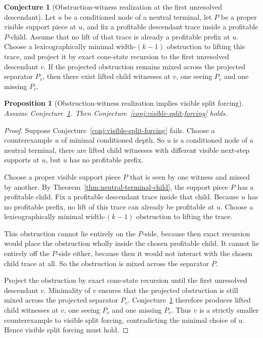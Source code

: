 \documentclass[11pt]{article}
\newtheorem{proposition}[theorem]{Proposition}
\theoremstyle{definition}
\newtheorem{conjecture}[theorem]{Conjecture}
\newcommand{\1}{\mathbf{1}}
\begin{document}
\begin{conjecture}[Obstruction-witness realization at the first unresolved descendant]\label{conj:owr}
Let $u$ be a conditioned node of a neutral terminal, let $P$ be a proper visible support piece at $u$, and fix a profitable descendant trace inside a profitable $P$-child.
Assume that no lift of that trace is already a profitable prefix at $u$.
Choose a lexicographically minimal width-$(k-1)$ obstruction to lifting this trace, and project it by exact cone-state recursion to the first unresolved descendant $v$.
If the projected obstruction remains mixed across the projected separator $P_v$, then there exist lifted child witnesses at $v$, one seeing $P_v$ and one missing $P_v$.
\end{conjecture}

\begin{proposition}[Obstruction-witness realization implies visible split forcing]\label{prop:owr-implies-vsf}
Assume Conjecture~\ref{conj:owr}.
Then Conjecture~\ref{conj:visible-split-forcing} holds.
\end{proposition}

\begin{proof}
Suppose Conjecture~\ref{conj:visible-split-forcing} fails.
Choose a counterexample $u$ of minimal conditioned depth.
So $u$ is a conditioned node of a neutral terminal, there are lifted child witnesses with different visible next-step supports at $u$, but $u$ has no profitable prefix.

Choose a proper visible support piece $P$ that is seen by one witness and missed by another.
By Theorem~\ref{thm:neutral-terminal-child}, the support piece $P$ has a profitable child.
Fix a profitable descendant trace inside that child.
Because $u$ has no profitable prefix, no lift of this trace can already be profitable at $u$.
Choose a lexicographically minimal width-$(k-1)$ obstruction to lifting the trace.

This obstruction cannot lie entirely on the $P$-side, because then exact recursion would place the obstruction wholly inside the chosen profitable child.
It cannot lie entirely off the $P$-side either, because then it would not interact with the chosen child trace at all.
So the obstruction is mixed across the separator $P$.

Project the obstruction by exact cone-state recursion until the first unresolved descendant $v$.
Minimality of $v$ ensures that the projected obstruction is still mixed across the projected separator $P_v$.
Conjecture~\ref{conj:owr} therefore produces lifted child witnesses at $v$, one seeing $P_v$ and one missing $P_v$.
Thus $v$ is a strictly smaller counterexample to visible split forcing, contradicting the minimal choice of $u$.
Hence visible split forcing must hold.
\end{proof}
\end{document}
